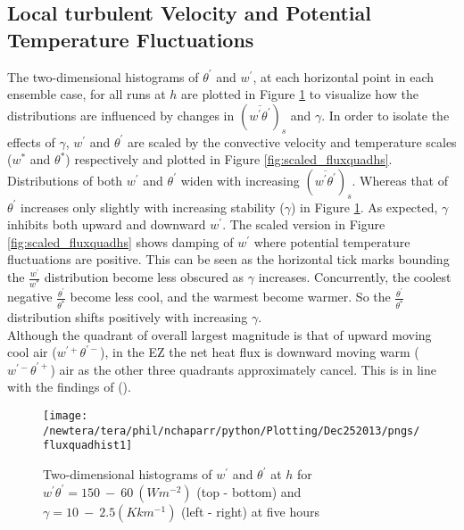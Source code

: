 \clearpage

\subsection{Local turbulent Velocity and Potential Temperature Fluctuations}
\label{subsec:fluxquadrants}     
\FloatBarrier

The two-dimensional histograms of $\theta^{'}$ and $w^{'}$, at each horizontal point in each ensemble case, for all runs at $h$ are plotted in Figure \ref{fig:fluxquadsh} to visualize how the distributions are influenced by changes in $(\overline{w^{'} \theta^{'}})_{s}$ and $\gamma$.  In order to isolate the effects of $\gamma$,  $w^{'}$ and $\theta^{'}$ are scaled by the convective velocity and temperature scales ($w^{*}$ and $\theta^{*}$) respectively and plotted in Figure \ref{fig:scaled_fluxquadhs}.\\

Distributions of both $w^{'}$ and $\theta^{'}$ widen with increasing $(\overline{w^{'}\theta^{'}})_{s}$.  Whereas that of $\theta^{'}$ increases only slightly with increasing stability ($\gamma$) in Figure \ref{fig:fluxquadsh}.  As expected, $\gamma$ inhibits both upward and downward $w^{'}$. The scaled version in Figure \ref{fig:scaled_fluxquadhs} shows damping of $w^{'}$ where potential temperature fluctuations are positive.  This can be seen as the horizontal tick marks bounding the $\frac{w^{'}}{w^{*}}$ distribution become less obscured as $\gamma$ increases.  Concurrently, the coolest negative $\frac{\theta^{'}}{\theta^{*}}$ become less cool, and the warmest become warmer.  So the $\frac{\theta^{'}}{\theta^{*}}$ distribution shifts positively with increasing $\gamma$.\\ 

Although the quadrant of overall largest magnitude is that of upward moving cool air ($w^{'+}\theta^{'-}$), in the \acs{EZ} the net heat flux is downward moving warm ($w^{'-}\theta^{'+}$) air as the other three quadrants approximately cancel.  This is in line with the findings of \citeauthor{SullMoengStev} (\citeyear{SullMoengStev}). \\


\begin{figure}[htbp]
\centering
 \texttt{[image: /newtera/tera/phil/nchaparr/python/Plotting/Dec252013/pngs/fluxquadhist1]}                 
\caption[Two-dimensional Distributions of $w^{'}$ and $\theta^{'}$ for all Runs]{Two-dimensional histograms of $w^{'}$ and $\theta^{'}$ at $h$ for $w^{'}\theta^{'} = 150 \ - \ 60\ (Wm^{-2})$ (top - bottom) and $\gamma = 10 \ - \  2.5 (Kkm^{-1})$ (left - right) at five hours}
\label{fig:fluxquadsh}
\end{figure}

